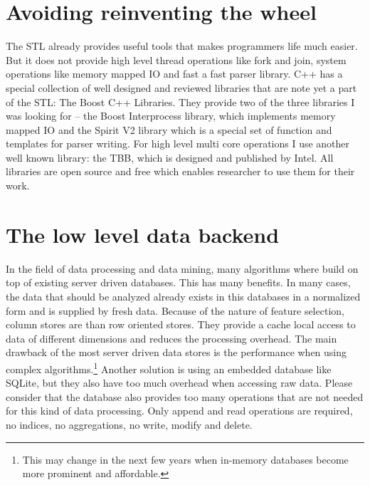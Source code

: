 \section{Avoiding reinventing the wheel}
The STL already provides useful tools that makes programmers life much easier. But it does not provide high level thread operations like fork and join, system operations like memory mapped IO and fast a fast parser library. C++ has a special collection of well designed and reviewed libraries that are note yet a part of the STL: The Boost C++ Libraries. They provide two of the three libraries I was looking for -- the Boost Interprocess library, which implements memory mapped IO and the Spirit V2 library which is a special set of function and templates for parser writing. For high level multi core operations I use another well known library: the TBB, which is designed and published by Intel. All libraries are open source and free which enables researcher to use them for their work.

\section{The low level data backend}
In the field of data processing and data mining, many algorithms where build on top of existing server driven databases. This has many benefits. In many cases, the data that should be analyzed already exists in this databases in a normalized form and is supplied by fresh data. Because of the nature of feature selection, column stores are than row oriented stores. They provide a cache local access to data of different dimensions and reduces the processing overhead. The main drawback of the most server driven data stores is the performance when using complex algorithms.\footnote{This may change in the next few years when in-memory databases become more prominent and affordable.} Another solution is using an embedded database like SQLite, but they also have too much overhead when accessing raw data. Please consider that the database also provides too many operations that are not needed for this kind of data processing. Only append and read operations are required, no indices, no aggregations, no write, modify and delete.

